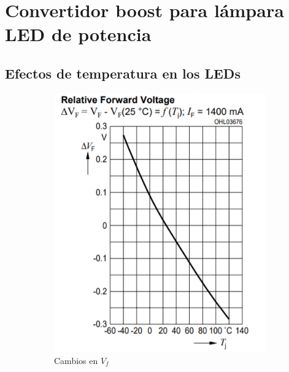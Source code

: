 \documentclass[e4-tp2-main.tex]{subfiles}
\begin{document}
\section{Convertidor boost para l\'ampara LED de potencia}

\subsection{Efectos de temperatura en los LEDs}

\begin{figure}
    \centering
    \begin{subfigure}[t]{0.25\textwidth}
    	\includegraphics[width=\textwidth]{images/ej2/Cambio_Vf_LED.png}
    	\caption{Cambios en $V_f$}
    \end{subfigure}
    \begin{subfigure}[t]{0.25\textwidth}

\end{subfigure}
\end{figure}
\end{document}
